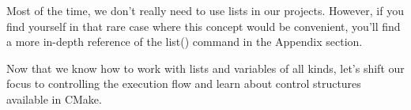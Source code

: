 Most of the time, we don't really need to use lists in our projects. However, if you find yourself in that rare case where this concept would be convenient, you'll find a more in-depth reference of the list() command in the Appendix section.

Now that we know how to work with lists and variables of all kinds, let's shift our focus to controlling the execution flow and learn about control structures available in CMake.




















